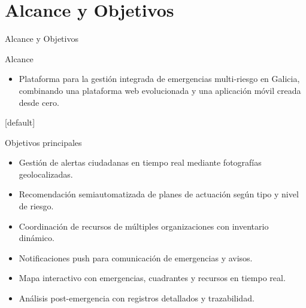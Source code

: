 \section{Alcance y Objetivos}

\begin{frame}[c,shrink]{Alcance y Objetivos}

    \begin{block}{Alcance}
            \begin{itemize}
                \item Plataforma para la gestión integrada de emergencias multi-riesgo en Galicia, combinando una plataforma web evolucionada y una aplicación móvil creada desde cero.
            \end{itemize}
        [default]
    \end{block}

    \begin{block}{Objetivos principales}
        \begin{itemize}
            \item Gestión de alertas ciudadanas en tiempo real mediante fotografías geolocalizadas.
            \item Recomendación semiautomatizada de planes de actuación según tipo y nivel de riesgo.
            \item Coordinación de recursos de múltiples organizaciones con inventario dinámico.
            \item Notificaciones push para comunicación de emergencias y avisos.
            \item Mapa interactivo con emergencias, cuadrantes y recursos en tiempo real.
            \item Análisis post-emergencia con registros detallados y trazabilidad.
        \end{itemize}
    \end{block}
\end{frame}




